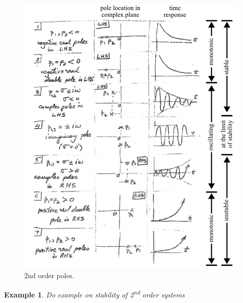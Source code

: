 \documentclass[12pt,letter]{article}
\newtheorem{ex}{Example}
\numberwithin{ex}{section} %
\newenvironment{example}{\begin{mdframed}[middlelinewidth=0.5mm]\begin{ex}\normalfont}{\end{ex}\end{mdframed}}
\numberwithin{re}{section} %
\numberwithin{equation}{section}	%
\begin{document}
\begin{figure}[H]
	\centering
	\includegraphics[width=6.5in]{../figures/2nd_order_poles}
	\caption{2nd order poles.}
\end{figure}



\begin{example}
Do example on stability of 2\textsuperscript{nd} order systems
\end{example}

%
%	
%	
%
%
%
\end{document}
